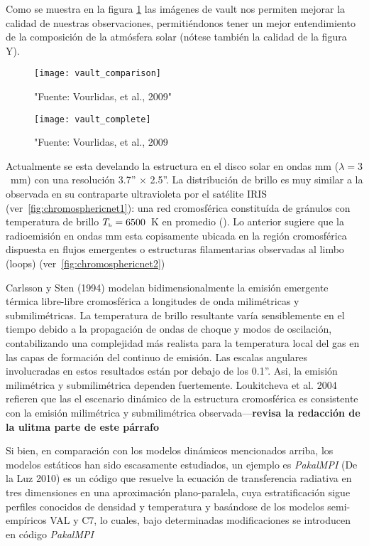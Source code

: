 Como se muestra en la figura \ref{fig:vault_compare} las im\'agenes de vault nos permiten mejorar la calidad de nuestras observaciones, permiti\'endonos tener un mejor entendimiento de la composici\'on de la atm\'osfera solar (n\'otese tambi\'en la calidad de la figura Y).

\begin{figure}[ht]
\centering
\texttt{[image: vault\_comparison]}
\caption{"Fuente: Vourlidas, et al., 2009"}
\label{fig:vault_compare}
\end{figure}

\begin{figure}[ht]
\centering
\texttt{[image: vault\_complete]}
\caption{"Fuente: Vourlidas, et al., 2009}
\label{fig:vault_complete}
\end{figure}

Actualmente se esta develando la estructura en el disco solar en ondas mm ($\lambda=3$~mm) con una resoluci\'on 3.7'' $\times$ 2.5''. La distribuci\'on de brillo es muy similar a la observada en su contraparte ultravioleta por el sat\'elite IRIS (ver~\ref{fig:chromosphericnet1}): una red cromosf\'erica constitu\'ida de gr\'anulos con temperatura de brillo $T_{\tiny{\mbox{b}}}=6500$~K en promedio (\cite{2018A&A...619L...6N}). Lo anterior sugiere que la radioemisi\'on en ondas mm esta copisamente ubicada en la regi\'on cromosf\'erica dispuesta en flujos emergentes o estructuras filamentarias observadas al limbo (loops) (ver~\ref{fig:chromosphericnet2})

Carlsson y Sten (1994) modelan bidimensionalmente la emisi\'on emergente t\'ermica libre-libre cromosf\'erica a longitudes de onda milim\'etricas y submilim\'etricas. La temperatura de brillo resultante var\'ia sensiblemente en el tiempo debido a la propagaci\'on de ondas de choque y modos de oscilaci\'on, contabilizando una complejidad m\'as realista para la temperatura local del gas en las capas de formaci\'on del continuo de emisi\'on. Las escalas angulares involucradas en estos resultados est\'an por debajo de los 0.1''. Asi, la emisi\'on milim\'etrica y submilim\'etrica dependen fuertemente. Loukitcheva et al. 2004 refieren que las el escenario din\'amico de la estructura cromosf\'erica es consistente con la emisi\'on milim\'etrica y submilim\'etrica observada---\textbf{revisa la redacci\'on de la ulitma parte de este p\'arrafo}

Si bien, en comparaci\'on con los modelos din\'amicos mencionados arriba, los modelos est\'aticos han sido escasamente estudiados, un ejemplo es \emph{PakalMPI} (De la Luz 2010) es un c\'odigo que resuelve la ecuaci\'on de transferencia radiativa en tres dimensiones en una aproximaci\'on plano-paralela, cuya estratificaci\'on sigue perfiles conocidos de densidad y temperatura y bas\'andose de los modelos semi-emp\'iricos VAL y C7, lo cuales, bajo determinadas modificaciones se introducen en c\'odigo \emph{PakalMPI}

